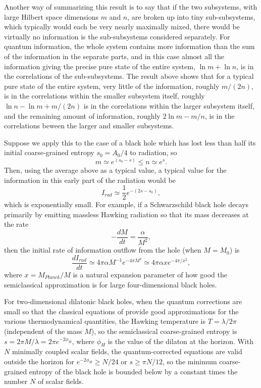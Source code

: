 \documentclass[12pt]{article}
\begin{document}
	Another way of summarizing this result is to say that if the
two subsystems,
with large Hilbert space dimensions $m$ and $n$, are
broken up into tiny sub-subsystems, which typically would each be
very nearly
maximally mixed, there would be virtually no information is the
sub-subsystems
considered separately.  For quantum information, the whole system
contains more
information than the sum of the information in the separate parts,
and in this
case almost all the information giving the precise pure state of the
entire
system, $\ln m+\ln n$, is in the correlations of the sub-subsystems.
The
result above shows that for a typical pure state of the entire
system, very
little of the information, roughly $m/(2n)$, is in the correlations
within
the smaller subsystem itself, roughly $\ln n -\ln m +m/(2n)$ is in
the
correlations within the larger subsystem itself, and the remaining
amount of
information, roughly
$2\ln m -m/n$, is in the correlations beween the larger and
smaller subsystems.

	Suppose we apply this to the case of a black hole which has
lost less than
half its initial coarse-grained entropy $s_0=A_0/4$ to radiation, so
	\begin{equation}
	m\simeq e^{(s_0-s)}\leq n\simeq e^s.
	\end{equation}
Then, using the average above as a typical value, a typical value for
the
information in this early part of the radiation would be
	\begin{equation}
	I_{rad} \simeq \frac{1}{2}e^{-(2s-s_0)},
	\end{equation}
which is exponentially small.  For example, if a Schwarzschild black
hole
decays primarily by emitting massless Hawking radiation so that its
mass
decreases at the rate
	\begin{equation}
	-\frac{dM}{dt}=\frac{\alpha}{M^2},
	\end{equation}
then the initial rate of information outflow from the hole (when
$M=M_0$) is
	\begin{equation}
	\frac{dI_{rad}}{dt} \simeq 4\pi\alpha M^{-1}e^{-4\pi
M^2}\simeq 4\pi\alpha x
e^{-4\pi/x^2},
	\end{equation}
where $x=M_{Planck}/M$ is a natural expansion parameter of how good
the
semiclassical approximation is for large four-dimensional black
holes.

	For two-dimensional dilatonic black holes, when the quantum
corrections
are small so that the classical equations of \cite{CGHS} provide good
approximations for the various thermodynamical quantities, the
Hawking
temperature is $T = \lambda/2\pi$ (independent of the mass $M$), so
the
semiclassical coarse-grained entropy is $s=2\pi M/\lambda=2\pi
e^{-2\phi_H}$,
where $\phi_H$ is the value of the dilaton at the horizon.  With $N$
minimally
coupled scalar fields, the quantum-corrected equations \cite{CGHS}
are valid
outside the horizon for $e^{-2\phi_H}\geq N/24$ or $s\geq \pi N/12$,
so the
minimum coarse-grained entropy of the black hole is bounded below by
a
constant times the number $N$ of scalar fields.
\end{document}
